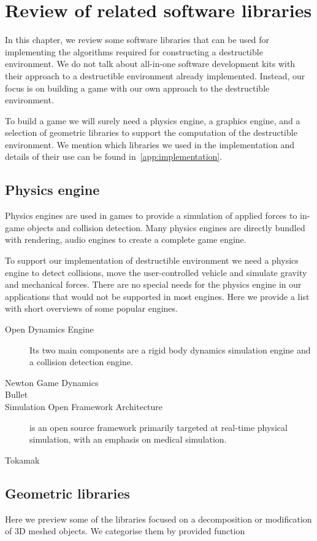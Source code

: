 \chapter{Review of related software libraries}
\label{chapt:technology}
In this chapter, we review some software libraries that can be used for implementing the algorithms required for constructing a destructible environment. We do not talk about all-in-one software development kits with their approach to a destructible environment already implemented. Instead, our focus is on building a game with our own approach to the destructible environment. 

To build a game we will surely need a physics engine, a graphics engine, and a selection of geometric libraries to support the computation of the destructible environment. We mention which libraries we used in the implementation and details of their use can be found in~\cref{app:implementation}.

\section{Physics engine}
Physics engines are used in games to provide a simulation of applied forces to in-game objects and collision detection. Many physics engines are directly bundled with rendering, audio engines to create a complete game engine. 

To support our implementation of destructible environment we need a physics engine to detect collisions, move the user-controlled vehicle and simulate gravity and mechanical forces. There are no special needs for the physics engine in our applications that would not be supported in most engines. Here we provide a list with short overviews of some popular engines.
\begin{description}
\item[Open Dynamics Engine] Its two main components are a rigid body dynamics simulation engine and a collision detection engine.
\item[Newton Game Dynamics]
\item[Bullet]
\item[Simulation Open Framework Architecture]  is an open source framework primarily targeted at real-time physical simulation, with an emphasis on medical simulation.
\item[Tokamak]
\end{description}

\section{Geometric libraries}
Here we preview some of the libraries focused on a decomposition or modification of 3D meshed objects. We categorise them by provided function 

